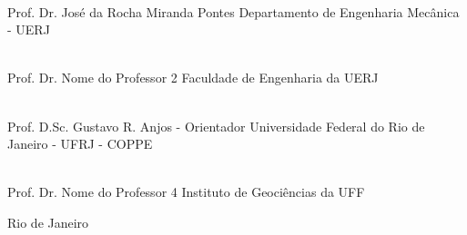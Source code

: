 \begin{flushright}
\parbox{12cm}{

\singlespacing

\hrulefill \\

\vspace{-.4cm}
Prof. Dr. José da Rocha Miranda Pontes
\newline
Departamento de Engenharia Mecânica - UERJ
\vspace{.7cm}

\hrulefill \\

\vspace{-.4cm}
Prof. Dr. Nome do Professor 2
\newline
Faculdade de Engenharia da UERJ
\vspace{.7cm}

\hrulefill \\

\vspace{-.4cm}
Prof. D.Sc. Gustavo R. Anjos - Orientador
\newline
Universidade Federal do Rio de Janeiro - UFRJ - COPPE
\vspace{.7cm}

\hrulefill \\

\vspace{-.4cm}
Prof. Dr. Nome do Professor 4
\newline
Instituto de Geociências da UFF
\vspace{.7cm}



}
\end{flushright}
\vfill

\begin{center}
Rio de Janeiro\linebreak \curYear
\end{center}
